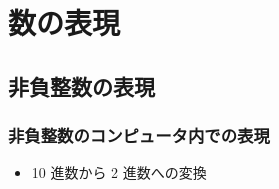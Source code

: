 \section{数の表現}
\subsection{非負整数の表現}
\begin{frame}[label=Top_Integer]
\frametitle{非負整数のコンピュータ内での表現}
  \begin{itemize}
\item 10 進数から 2 進数への変換
  \end{itemize}
  \begin{center}
   \begin{example}[10進$\Leftrightarrow$2進]
   \begin{columns}[t]
    \begin{column}{3cm}
    \end{column}
    \begin{column}{3cm}
    \end{column}
   \end{columns}
   \end{example}
  \end{center}
\end{frame}
